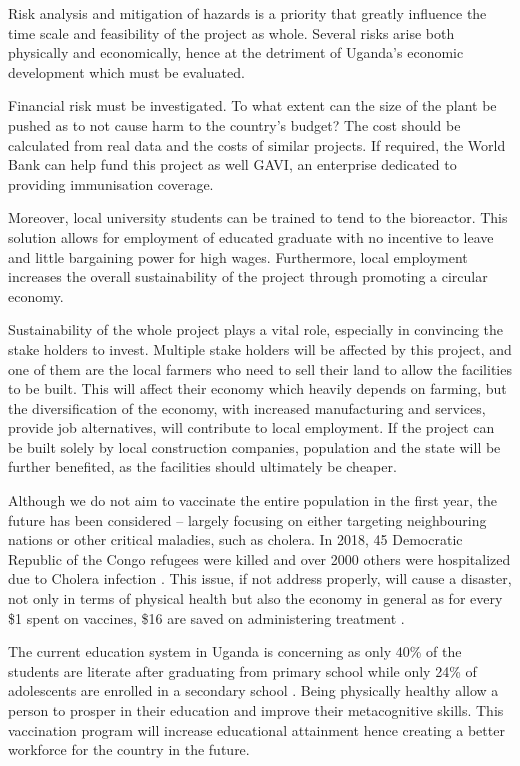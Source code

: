 Risk analysis and mitigation of hazards is a priority that greatly influence the time scale and feasibility of the project as whole. Several risks arise both physically and economically, hence at the detriment of Uganda’s economic development which must be evaluated.  

Financial risk must be investigated. To what extent can the size of the plant be pushed as to not cause harm to the country’s budget?  The cost should be calculated from real data and the costs of similar projects. If required, the World Bank can help fund this project as well GAVI, an enterprise dedicated to providing immunisation coverage.  

Moreover, local university students can be trained to tend to the bioreactor. This solution allows for employment of educated graduate with no incentive to leave and little bargaining power for high wages. Furthermore, local employment increases the overall sustainability of the project through promoting a circular economy.

Sustainability of the whole project plays a vital role, especially in convincing the stake holders to invest. Multiple stake holders will be affected by this project, and one of them are the local farmers who need to sell their land to allow the facilities to be built. This will affect their economy which heavily depends on farming, but the diversification of the economy, with increased manufacturing and services, provide job alternatives, will contribute to local employment. If the project can be built solely by local construction companies,  population and the state will be further benefited, as the facilities should ultimately be cheaper. 

Although we do not aim to vaccinate the entire population in the first year, the future has been considered – largely focusing on either targeting neighbouring nations or other critical maladies, such as cholera. In 2018, 45 Democratic Republic of the Congo refugees were killed and over 2000 others were hospitalized due to Cholera infection \cite{WHO2018}. This issue, if not address properly, will cause a disaster, not only in terms of physical health but also the economy in general as for every \$1 spent on vaccines, \$16 are saved on administering treatment \cite{GaviTheVaccineAlliance2019}. 

The current education system in Uganda is concerning as only 40\%  of the students are literate after graduating from primary school while only 24\%  of adolescents are enrolled in a secondary school \cite{UNICEF&GovernmentOfUganda2015}. Being physically healthy allow a person to prosper in their education and improve their metacognitive skills. This vaccination program will increase educational attainment hence creating a better workforce for the country in the future. 